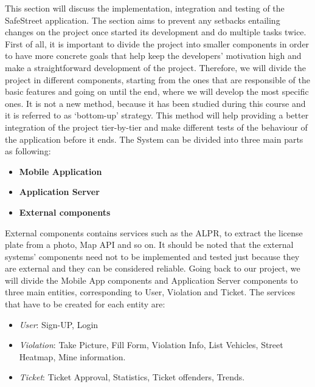 This section will discuss the implementation, integration and testing of the SafeStreet application. The section aims to prevent any setbacks entailing changes on the project once started its development and do multiple tasks twice. First of all, it is important to divide the project into smaller components in order to have more concrete goals that help keep the developers’ motivation high and make a straightforward development of the project. Therefore, we will divide the project in different components, starting from the ones that are responsible of the basic features and going on until the end, where we will develop the most speciﬁc ones. It is not a new method, because it has been studied during this course and it is referred to as ‘bottom-up’ strategy. This method will help providing a better integration of the project tier-by-tier and make different tests of the behaviour of the application before it ends. The System can be divided into three main parts as following:\\

\begin{itemize}
    \item \textbf{Mobile Application}
    \item \textbf{Application Server}
    \item \textbf{External components}
\end{itemize}
External components contains services such as the ALPR, to extract the license plate from a photo, Map API and so on. It should be noted that the external systems’ components need not to be implemented and tested just because they are external and they can be considered reliable.
Going back to our project, we will divide the Mobile App components and Application Server components to three main entities, corresponding to User, Violation and Ticket.
The services that have to be created for each entity are:
\begin{itemize}
\item{} \textit{User}: Sign-UP, Login
\item{} \textit{Violation}: Take Picture, Fill Form, Violation Info, List Vehicles, Street Heatmap, Mine information.
\item{} \textit{Ticket}: Ticket Approval, Statistics, Ticket offenders, Trends.
\end{itemize}

